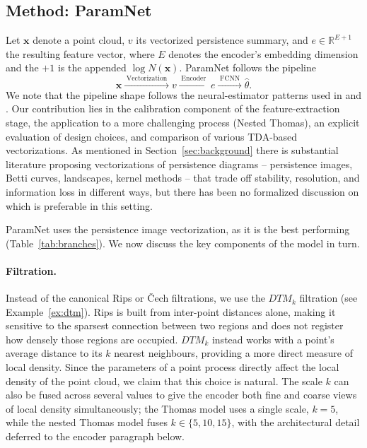 \documentclass[11pt,a4paper]{article}
\newcommand{\R}{\mathbb{R}}
\newcommand{\pc}{\mathbf{x}}
\theoremstyle{definitioncolon}
\begin{document}
\subsection{Method: ParamNet}
\label{ssec:method}

Let $\pc$ denote a point cloud, $v$ its vectorized persistence summary, and
$e \in \R^{E + 1}$ the resulting feature vector, where $E$ denotes the encoder's
embedding dimension and the $+1$ is the appended $\log N(\pc)$. ParamNet
follows the pipeline
    \begin{equation}
    \label{eq:pipeline}
    \pc \xrightarrow{\;\text{Vectorization}\;} v
    \xrightarrow{\;\text{Encoder}\;} e
    \xrightarrow{\;\text{FCNN}\;} \hat\theta.
    \end{equation}
We note that the pipeline shape follows the neural-estimator patterns used in
\citet{vihrs2022neural} and \citet{yip2025learning}. Our contribution
lies in the calibration component of the feature-extraction stage, 
the application to a more challenging process (Nested Thomas), an explicit
evaluation of design choices, and comparison of various TDA-based vectorizations.
As mentioned in Section~\ref{sec:background} there is substantial literature
proposing vectorizations of persistence
diagrams -- persistence images, Betti curves, landscapes, kernel methods --
that trade off stability, resolution, and information loss in different ways,
but there has been no formalized discussion on which is preferable in this setting.

ParamNet uses the persistence image vectorization, as it is the best performing (Table~\ref{tab:branches}). We now discuss the key components of the model in turn.

\paragraph{Filtration.} 
Instead of the canonical Rips or \v{C}ech filtrations,
we use the $DTM_k$ filtration (see Example~\ref{ex:dtm}).
Rips is built from inter-point distances alone, making it sensitive to the
sparsest connection between two regions and does not register how densely those
regions are occupied. $DTM_k$ instead works with a point's average distance to its
$k$ nearest neighbours, providing a more direct measure of local density.
Since the parameters of a point process directly affect the local density of the
point cloud, we claim that this choice is natural. The scale $k$ can also be
fused across several values to give the encoder both fine and coarse views of
local density simultaneously; the Thomas model uses a single scale, $k=5$,
while the nested Thomas model fuses $k\in\{5,10,15\}$, with the architectural
detail deferred to the encoder paragraph below.
\end{document}
